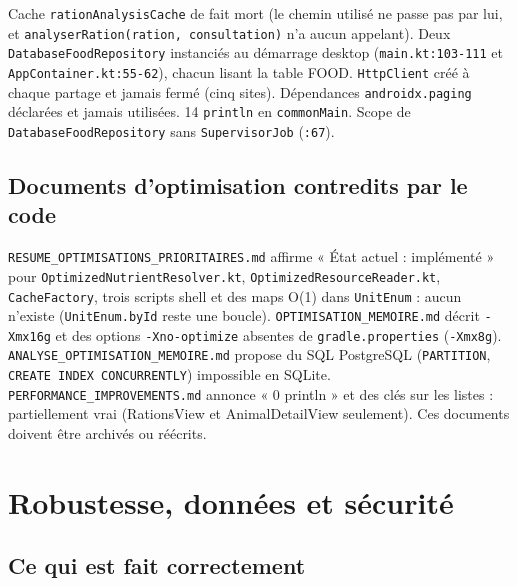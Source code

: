 \documentclass[11pt,a4paper]{article}
\newcommand{\fichier}[1]{\texttt{\small #1}}
\newcommand{\code}[1]{\texttt{#1}}
\newcommand{\sev}[1]{\textbf{#1}}
\begin{document}
\begin{description}[style=nextline]
\item[\sev{Mineur} --- Divers.]
  Cache \code{rationAnalysisCache} de fait mort (le chemin utilisé ne passe pas par lui, et
  \code{analyserRation(ration, consultation)} n'a aucun appelant). Deux
  \code{DatabaseFoodRepository} instanciés au démarrage desktop (\fichier{main.kt:103-111} et
  \fichier{AppContainer.kt:55-62}), chacun lisant la table FOOD. \code{HttpClient} créé à chaque
  partage et jamais fermé (cinq sites). Dépendances \code{androidx.paging} déclarées et jamais
  utilisées. 14 \code{println} en \code{commonMain}. Scope de \code{DatabaseFoodRepository} sans
  \code{SupervisorJob} (\code{:67}).
\end{description}

\subsection*{Documents d'optimisation contredits par le code}

\fichier{RESUME\_OPTIMISATIONS\_PRIORITAIRES.md} affirme « État actuel : implémenté » pour
\code{OptimizedNutrientResolver.kt}, \code{OptimizedResourceReader.kt}, \code{CacheFactory},
trois scripts shell et des maps O(1) dans \code{UnitEnum} : aucun n'existe (\code{UnitEnum.byId}
reste une boucle). \fichier{OPTIMISATION\_MEMOIRE.md} décrit \code{-Xmx16g} et des options
\code{-Xno-optimize} absentes de \fichier{gradle.properties} (\code{-Xmx8g}).
\fichier{ANALYSE\_OPTIMISATION\_MEMOIRE.md} propose du SQL PostgreSQL (\code{PARTITION},
\code{CREATE INDEX CONCURRENTLY}) impossible en SQLite. \fichier{PERFORMANCE\_IMPROVEMENTS.md}
annonce « 0 println » et des clés sur les listes : partiellement vrai (RationsView et
AnimalDetailView seulement). Ces documents doivent être archivés ou réécrits.

\section{Robustesse, données et sécurité}\label{sec:robustesse}

\subsection*{Ce qui est fait correctement}
\end{document}
